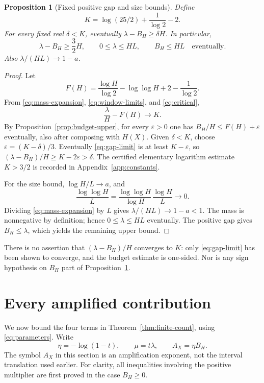 \documentclass[11pt,a4paper]{article}
\newtheorem{proposition}[theorem]{Proposition}
\theoremstyle{definition}
\theoremstyle{remark}
\numberwithin{equation}{section}
\begin{document}
\begin{proposition}[Fixed positive gap and size bounds]\label{prop:gap}
Define
\begin{equation}\label{eq:K}
 K=\log(25/2)+\frac1{\log2}-2.
\end{equation}
For every fixed real $\delta<K$, eventually
$\lambda-B_H\ge\delta H$. In particular,
\begin{equation}\label{eq:gap-and-bounds}
 \lambda-B_H\ge\frac32H,\qquad
 0\le\lambda\le HL,\qquad B_H\le HL
 \quad\text{eventually}.
\end{equation}
Also $\lambda/(HL)\to1-a$.
\end{proposition}
\begin{proof}
Let
\[
 F(H)=\frac{\log H}{\log2}-\log\log H+2-\frac1{\log2}.
\]
From \eqref{eq:mass-expansion}, \eqref{eq:window-limits}, and
\eqref{eq:critical},
\begin{equation}\label{eq:gap-limit}
 \frac\lambda H-F(H)\longrightarrow K.
\end{equation}
By Proposition~\ref{prop:budget-upper}, for every $\varepsilon>0$ one has
$B_H/H\le F(H)+\varepsilon$ eventually, also after composing with $H(X)$.
Given $\delta<K$, choose $\varepsilon=(K-\delta)/3$.
Eventually \eqref{eq:gap-limit} is at least $K-\varepsilon$, so
$(\lambda-B_H)/H\ge K-2\varepsilon>\delta$.
The certified elementary logarithm estimate $K>3/2$ is recorded in
Appendix~\ref{app:constants}.

For the size bound, $\log H/L\to a$, and
\[
 \frac{\log\log H}{L}
 =\frac{\log\log H}{\log H}\,\frac{\log H}{L}\longrightarrow0.
\]
Dividing \eqref{eq:mass-expansion} by $L$ gives
$\lambda/(HL)\to1-a<1$. The mass is nonnegative by definition; hence
$0\le\lambda\le HL$ eventually. The positive gap gives $B_H\le\lambda$,
which yields the remaining upper bound.
\end{proof}
There is no assertion that $(\lambda-B_H)/H$ converges to $K$: only
\eqref{eq:gap-limit} has been shown to converge, and the budget estimate is
one-sided. Nor is any sign hypothesis on $B_H$ part of
Proposition~\ref{prop:gap}.

\section{Every amplified contribution}\label{sec:errors}
We now bound the four terms in Theorem~\ref{thm:finite-count}, using
\eqref{eq:parameters}. Write
\[
 \eta=-\log(1-t),\qquad \mu=t\lambda,
 \qquad A_X=\eta B_H.
\]
The symbol $A_X$ in this section is an amplification exponent, not the interval
translation used earlier. For clarity, all inequalities involving the positive
multiplier are first proved in the case $B_H\ge0$.
\end{document}
